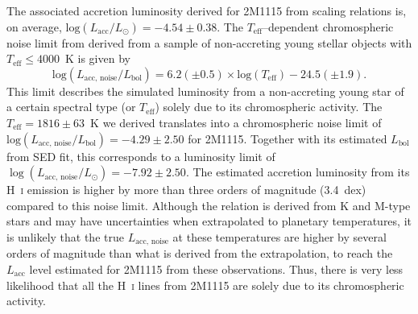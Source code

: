 \documentclass{aa}
\newcommand{\lsun}{\ensuremath{L_\odot}\xspace}
\newcommand{\Teff}{\ensuremath{T_{\mathrm{eff}}}\xspace}
\newcommand{\Lbol}{\ensuremath{L_{\mathrm{bol}}}\xspace}
\newcommand{\Lacc}{\ensuremath{L_{\mathrm{acc}}}\xspace}
\newcommand{\Hi}{H~\textsc{i}\xspace}
\begin{document}
The associated accretion luminosity derived for 2M1115 from \cite{aoyama2021} scaling relations is, on average, $\mathrm{log}(L_{\mathrm{acc}}/L_{\odot})=-4.54\pm0.38$. The \Teff--dependent chromospheric noise limit from \cite{manara2013} \citep[see also][]{venuti2019} derived from a sample of non-accreting young stellar objects with \Teff$\leq4000$~K is given by
\begin{equation}
    \mathrm{log}(L_{\mathrm{acc},\,\mathrm{noise}}/\Lbol)=6.2(\pm0.5)\times\mathrm{log}(T_{\mathrm{eff}}) - 24.5(\pm1.9).
\end{equation}
This limit describes the simulated luminosity from a non-accreting young star of a certain spectral type (or \Teff) solely due to its chromospheric activity.
The $\Teff=1816\pm63$~K we derived translates into a chromospheric noise limit of $\mathrm{log}(L_{\mathrm{acc,\,noise}}/L_{\mathrm{bol}})=-4.29\pm2.50$ for 2M1115. Together with its estimated \Lbol from SED fit, this corresponds to a luminosity limit of $\log(L_{\mathrm{acc},\,\mathrm{noise}}/\lsun)=-7.92\pm2.50$. The estimated accretion luminosity from its \Hi emission is higher by more than three orders of magnitude (3.4~dex) compared to this noise limit. Although the relation is derived from K and M-type stars and may have uncertainties when extrapolated to planetary temperatures, it is unlikely that the true $L_{\mathrm{acc,\,noise}}$ at these temperatures are higher by several orders of magnitude than what is derived from the extrapolation, to reach the \Lacc level estimated for 2M1115 from these observations. Thus, there is very less likelihood that all the \Hi lines from 2M1115 are solely due to its chromospheric activity. 
\end{document}
